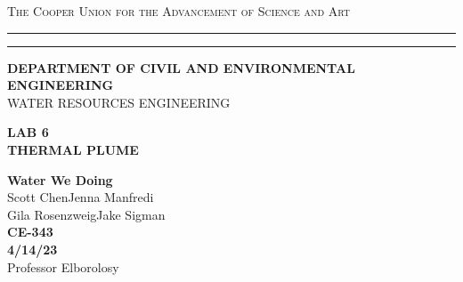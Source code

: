 \begin{titlepage}
    \begin{center}
    {{\Large{\textsc{The Cooper Union for the Advancement of Science and Art}}}} \rule[0.1cm]{15.8cm}{0.1mm}
    \rule[0.5cm]{15.8cm}{0.6mm}
    {\small{\bf DEPARTMENT OF CIVIL AND ENVIRONMENTAL ENGINEERING}}\\
    {\footnotesize{WATER RESOURCES ENGINEERING}}
    \end{center}
    \vspace{15mm}
    \begin{center}
    {\large{\bf LAB 6\\}}
    \vspace{5mm}
    {\Large{\bf THERMAL PLUME}}
    \end{center}
    \vspace{35mm}
    \par
    \noindent
    \hfill
    \vspace{20mm}
    \begin{center}
    {\large{ {\bf Water We Doing} \\ { Scott Chen\hspace{5mm}Jenna Manfredi\\Gila Rosenzweig\hspace{5mm}Jake Sigman}}}
    \vspace{40mm}
    {\large {\bf \\CE-343 \\ 4/14/23 \\}}
    \vspace{15mm}
    {\normalsize{Professor Elborolosy}}
    \end{center}
\end{titlepage}